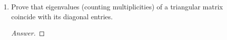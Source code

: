 \documentclass[../psets.tex]{subfiles}
\begin{document}
\begin{enumerate}[label={\textbf{1.\arabic*.}}]
\begin{proof}[Answer]
        that the eigenvectors are
        \begin{align*}
            x &=
            \begin{pmatrix}
                1\\
                -i\\
            \end{pmatrix}&
            y &=
            \begin{pmatrix}
                1\\
                i\\
            \end{pmatrix}
        \end{align*}
    \end{proof}
    \item Prove that eigenvalues (counting multiplicities) of a triangular matrix coincide with its diagonal entries.
    \begin{proof}[Answer]


\end{proof}
\end{enumerate}
\end{document}
